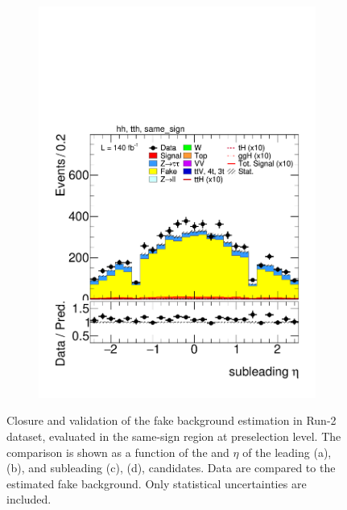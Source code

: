 \begin{figure}[htbp]
\begin{subfigure}[b]{0.45\textwidth}
      \includegraphics[width=\textwidth]{images/fakes_run2/plot_tau_1_eta_hh_tth_15_16_17_18_same_sign.pdf}
      \caption{}
    \end{subfigure}
  
    \caption{
      Closure and validation of the fake \tauhad background estimation in Run-2 dataset, evaluated in the same-sign region at preselection level.
      The comparison is shown as a function of the \pt and $\eta$ of the leading (a), (b), and subleading (c), (d), \tauhad candidates. 
      Data are compared to the estimated fake \tauhad background. Only statistical uncertainties are included.
    }
    \label{fig:closure_validation_run2}
  \end{figure}

